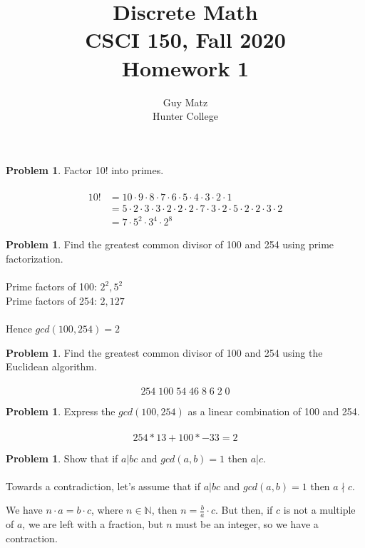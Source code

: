 \documentclass[10pt,leqno ]{article}
\title{Discrete Math\\
CSCI 150, Fall 2020\\
Homework 1}
\author{Guy Matz \\
Hunter College}
\theoremstyle{definition}
\newtheorem{problem}[theorem]{Problem}
\begin{document}
\begin{problem} Factor 10! into primes.
\\\\
\Large
\begin{align*}
10! &= 10 \cdot 9 \cdot 8 \cdot 7  \cdot  6  \cdot  5  \cdot 4 \cdot 3 \cdot 2 \cdot 1\\
    &= 5 \cdot 2 \cdot 3 \cdot 3 \cdot 2 \cdot 2 \cdot 2 \cdot 7 \cdot 3 \cdot 2 \cdot 5 \cdot 2 \cdot 2 \cdot 3 \cdot 2\\
    &= 7 \cdot 5^2 \cdot 3^4 \cdot 2^8
\end{align*}
\end{problem}
\newpage

\begin{problem} Find the greatest common divisor of 100 and 254 using prime factorization.
\\\\
\Large
Prime factors of 100: $2^2, 5^2$\\
Prime factors of 254: $2, 127$\\
\\
Hence $gcd(100, 254) = 2$


\end{problem}
\newpage

\begin{problem} Find  the  greatest  common  divisor  of  100  and  254  using  the  Euclidean algorithm.
\\\\
\Large
$$254 \; 100 \; 54 \; 46 \; 8 \; 6 \; 2 \; 0$$
\end{problem}
\newpage

\begin{problem} Express the $gcd(100,254)$ as a linear combination of 100 and 254.
\\\\
\Large
$$254 * 13 + 100 * -33 = 2$$
\end{problem}
\newpage

\begin{problem} Show that if $a|bc$ and $gcd(a, b) = 1$ then $a|c$.
\\\\
\Large
Towards a contradiction, let's assume that if $a|bc$ and $gcd(a,b) = 1$ then $a \nmid c$.  

We have $n \cdot a = b \cdot c$, where $n \in \mathbb{N}$, 
then $n = \frac{b}{a} \cdot c$.  But then, if $c$ is not a multiple of $a$, 
we are left with a fraction, but $n$ must be an integer, so we have a contraction.
\end{problem}
\newpage
\end{document}
